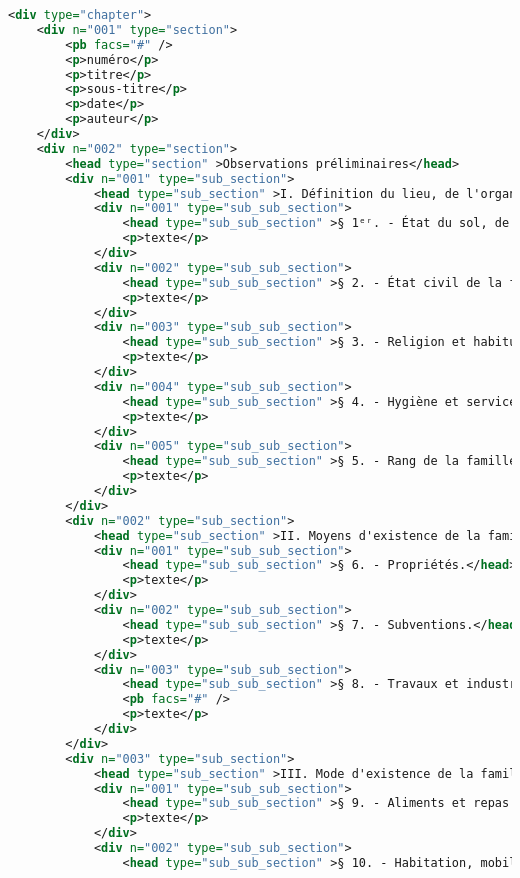 \begin{lstlisting}[language=XML,breaklines]
<div type="chapter">
    <div n="001" type="section">
        <pb facs="#" />
        <p>numéro</p>
        <p>titre</p>
        <p>sous-titre</p>
        <p>date</p>
        <p>auteur</p>
    </div>
    <div n="002" type="section">
        <head type="section" >Observations préliminaires</head>
        <div n="001" type="sub_section">
            <head type="sub_section" >I. Définition du lieu, de l'organisation industrielle et de la famille</head>
            <div n="001" type="sub_sub_section">
                <head type="sub_sub_section" >§ 1ᵉʳ. - État du sol, de l'industrie et de la population.</head>
                <p>texte</p>
            </div>
            <div n="002" type="sub_sub_section">
                <head type="sub_sub_section" >§ 2. - État civil de la famille.</head>
                <p>texte</p>
            </div>
            <div n="003" type="sub_sub_section">
                <head type="sub_sub_section" >§ 3. - Religion et habitudes morales.</head>
                <p>texte</p>
            </div>
            <div n="004" type="sub_sub_section">
                <head type="sub_sub_section" >§ 4. - Hygiène et service de santé.</head>
                <p>texte</p>
            </div>
            <div n="005" type="sub_sub_section">
                <head type="sub_sub_section" >§ 5. - Rang de la famille.</head>
                <p>texte</p>
            </div>
        </div>
        <div n="002" type="sub_section">
            <head type="sub_section" >II. Moyens d'existence de la famille</head>
            <div n="001" type="sub_sub_section">
                <head type="sub_sub_section" >§ 6. - Propriétés.</head>
                <p>texte</p>
            </div>
            <div n="002" type="sub_sub_section">
                <head type="sub_sub_section" >§ 7. - Subventions.</head>
                <p>texte</p>
            </div>
            <div n="003" type="sub_sub_section">
                <head type="sub_sub_section" >§ 8. - Travaux et industries.</head>
                <pb facs="#" />
                <p>texte</p>
            </div>
        </div>
        <div n="003" type="sub_section">
            <head type="sub_section" >III. Mode d'existence de la famille</head>
            <div n="001" type="sub_sub_section">
                <head type="sub_sub_section" >§ 9. - Aliments et repas.</head>
                <p>texte</p>
            </div>
            <div n="002" type="sub_sub_section">
                <head type="sub_sub_section" >§ 10. - Habitation, mobilier et vêtements.</head>

\end{lstlisting}
